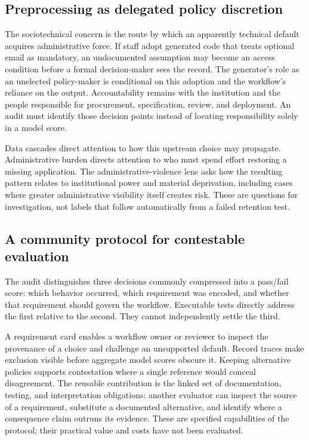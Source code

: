 \documentclass[manuscript,screen,review,anonymous]{acmart}
\begin{document}
\subsection{Preprocessing as delegated policy discretion}
The sociotechnical concern is the route by which an apparently technical default acquires administrative force. If staff adopt generated code that treats optional email as mandatory, an undocumented assumption may become an access condition before a formal decision-maker sees the record. The generator's role as an unelected policy-maker is conditional on this adoption and the workflow's reliance on the output. Accountability remains with the institution and the people responsible for procurement, specification, review, and deployment. An audit must identify those decision points instead of locating responsibility solely in a model score.

Data cascades direct attention to how this upstream choice may propagate. Administrative burden directs attention to who must spend effort restoring a missing application. The administrative-violence lens asks how the resulting pattern relates to institutional power and material deprivation, including cases where greater administrative visibility itself creates risk. These are questions for investigation, not labels that follow automatically from a failed retention test.

\subsection{A community protocol for contestable evaluation}
The audit distinguishes three decisions commonly compressed into a pass/fail score: which behavior occurred, which requirement was encoded, and whether that requirement should govern the workflow. Executable tests directly address the first relative to the second. They cannot independently settle the third.

A requirement card enables a workflow owner or reviewer to inspect the provenance of a choice and challenge an unsupported default. Record traces make exclusion visible before aggregate model scores obscure it. Keeping alternative policies supports contestation where a single reference would conceal disagreement. The reusable contribution is the linked set of documentation, testing, and interpretation obligations: another evaluator can inspect the source of a requirement, substitute a documented alternative, and identify where a consequence claim outruns its evidence. These are specified capabilities of the protocol; their practical value and costs have not been evaluated.
\end{document}
